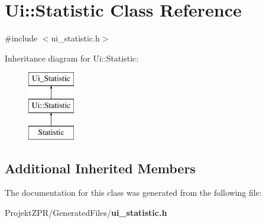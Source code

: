 \section{Ui\-:\-:Statistic Class Reference}
\label{class_ui_1_1_statistic}


{\ttfamily \#include $<$ui\-\_\-statistic.\-h$>$}

Inheritance diagram for Ui\-:\-:Statistic\-:\begin{figure}[H]
\begin{center}
\leavevmode
\includegraphics[height=3.000000cm]{class_ui_1_1_statistic}
\end{center}
\end{figure}
\subsection*{Additional Inherited Members}


The documentation for this class was generated from the following file\-:\begin{DoxyCompactItemize}
\item 
Projekt\-Z\-P\-R/\-Generated\-Files/{\bf ui\-\_\-statistic.\-h}\end{DoxyCompactItemize}

